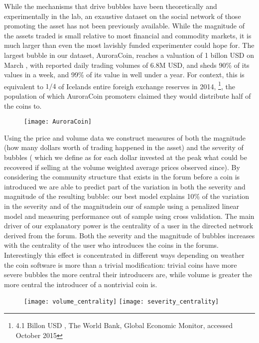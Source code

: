 While the mechanisms that drive bubbles have been theoretically  \cite{abolafia1988enacting, earl2007decision, bakker2010social, harras2011grow} and experimentally \cite{moinas2013bubble} in the lab, an exaustive dataset on the social network of those promoting the asset has not been previously available.
While the magnitude of the assets traded is small relative to most financial and commodity markets, it is much larger than even the most lavishly funded experimenter could hope for.
The largest bubble in our dataset, AuroraCoin, reaches a valuation of 1 billon USD on March , with reported daily trading volumes of 6.8M USD, and sheds 90\% of its values in a week, and 99\% of its value in well under a year.
For context, this is equivalent to $1/4$ of Icelands entire foreigh exchange reserves in 2014, \footnote{4.1 Billon USD , The World Bank, Global Economic Monitor, accessed October 2015}, the population of which AuroraCoin promoters claimed they would distribute half of the coins to.

\begin{figure}
\texttt{[image: AuroraCoin]}
\end{figure}

Using the price and volume data we construct measures of both  the magnitude (how many dollars worth of trading happened in the asset) and the severity of bubbles ( which we define as for each dollar invested at the peak what could be recovered if selling at the volume weighted average prices observed since).
By considering the community structure that exists in the forum before a coin is introduced we are able to predict part of the variation in both the severity and magnitude of the resulting bubble: our best model explains 10\% of the variation in the severity and of the magnitudein our of sample using a penalized linear model and measuring performance out of sample using cross validation. 
The main driver of our explanatory power is the centrality of a user in the directed network derived from the forum.
Both the severity and the magnitude of bubbles increases with the centrality of the user who introduces the coins in the forums.
Interestingly this effect is concentrated in different ways depending on weather the coin software is more than a trivial modification: trivial coins have more severe bubbles the more central their introducers are, while volume is greater the more central the introducer of a nontrivial coin is.


\begin{figure}
\texttt{[image: volume\_centrality]}
\texttt{[image: severity\_centrality]}
\end{figure}

